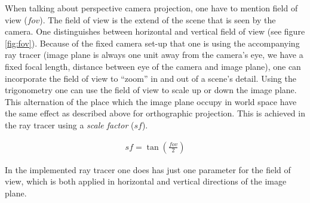 \documentclass{article}
\begin{document}
When talking about perspective camera projection, one have to mention field of view ($fov$). The field of view is the extend of the scene that is seen by the camera. One distinguishes between horizontal and vertical field of view (see figure \ref{fig:fov}). Because of the fixed camera set-up that one is using the accompanying ray tracer (image plane is always one unit away from the camera's eye, we have a fixed focal length, distance between eye of the camera and image plane), one can incorporate the field of view to ``zoom'' in and out of a scene's detail. Using the trigonometry one can use the field of view to scale up or down the image plane. This alternation of the place which the image plane occupy in world space have the same effect as described above for orthographic projection. This is achieved in the ray tracer using a \textit{scale factor} ($sf$). 

\begin{align}
sf = \tan(\frac{fov}{2})
\end{align}

In the implemented ray tracer one does has just one parameter for the field of view, which is both applied in horizontal and vertical directions of the image plane. 
\end{document}
